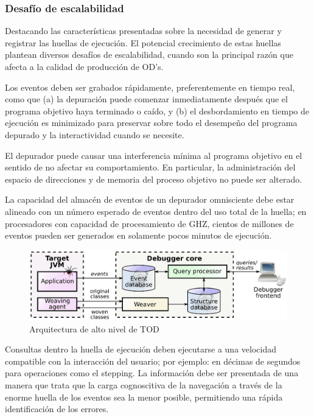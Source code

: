 \documentclass[12pt,legalpaper]{report}
\begin{document}
			\subsubsection{Desafío de escalabilidad \label{escalabilidad}}

Destacando las características presentadas sobre la necesidad de generar y registrar las huellas de ejecución.  El potencial crecimiento de estas huellas plantean diversos desafíos de escalabilidad, cuando son la principal razón que afecta a la calidad de producción de OD's.

Los eventos deben ser grabados rápidamente, preferentemente en tiempo real, como que (a) la depuración puede comenzar inmediatamente después que el programa objetivo haya terminado o caído, y (b) el desbordamiento en tiempo de ejecución es minimizado para preservar sobre todo el desempeño del programa depurado y la interactividad cuando se necesite.

El depurador puede causar una interferencia mínima al programa objetivo en el sentido de no afectar su comportamiento.  En particular, la administración del espacio de direcciones y de memoria del proceso objetivo no puede ser alterado.

La capacidad del almacén de eventos de un depurador omnisciente debe estar alineado con un número esperado de eventos dentro del uso total de la huella; en procesadores con capacidad de procesamiento de GHZ, cientos de millones de eventos pueden ser generados en solamente pocos minutos de ejecución.

\begin{figure}[hpb]
	\centering
	\includegraphics[scale=0.5]{images/TOD/TODArchitecture.eps}
	\caption{Arquitectura de alto nivel de TOD}
	\label{TODArchitecture}
\end{figure}

Consultas dentro la huella de ejecución deben ejecutarse a una velocidad compatible con la interacción del usuario; por ejemplo: en décimas de segundos para operaciones como el stepping.
La información debe ser presentada de una manera que trata que la carga cognoscitiva de la navegación a través de la enorme huella de los eventos sea la menor posible, permitiendo una rápida identificación de los errores.
\end{document}

